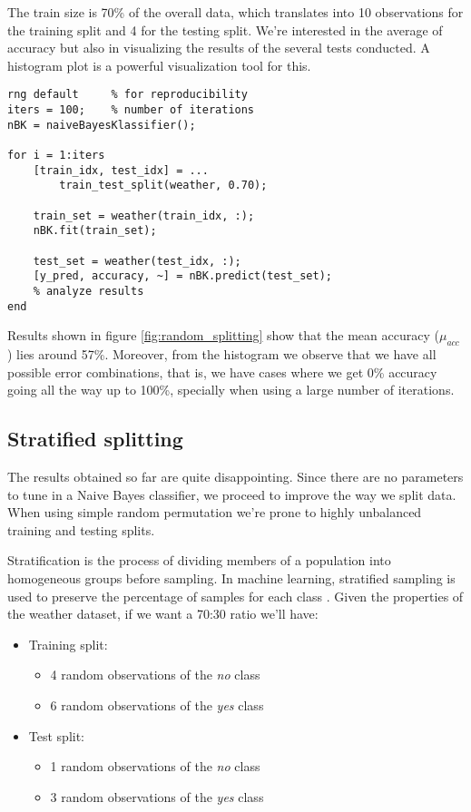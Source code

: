 The train size is 70\% of the overall data, which translates into 10 observations for the training split and 4 for the testing split. We're interested in the average of accuracy but also in visualizing the results of the several tests conducted. A histogram plot is a powerful visualization tool for this.
\begin{lstlisting}[caption=Simple script for testing classifier]
rng default     % for reproducibility
iters = 100;    % number of iterations
nBK = naiveBayesKlassifier();

for i = 1:iters
	[train_idx, test_idx] = ...
		train_test_split(weather, 0.70);
	
	train_set = weather(train_idx, :);
	nBK.fit(train_set);
	
	test_set = weather(test_idx, :);
	[y_pred, accuracy, ~] = nBK.predict(test_set);
	% analyze results
end
\end{lstlisting}

Results shown in figure \ref{fig:random_splitting} show that the mean accuracy ($\mu_{acc}$) lies around 57\%. Moreover, from the histogram we observe that we have all possible error combinations, that is, we have cases where we get 0\% accuracy going all the way up to 100\%, specially when using a large number of iterations.

\subsection{Stratified splitting}

The results obtained so far are quite disappointing. Since there are no parameters to tune in a Naive Bayes classifier, we proceed to improve the way we split data. When using simple random permutation we're prone to highly unbalanced training and testing splits.

Stratification is the process of dividing members of a population into homogeneous groups before sampling. In machine learning, stratified sampling is used to preserve the percentage of samples for each class \cite{scikit-learn}.
Given the properties of the weather dataset, if we want a 70:30 ratio we'll have:
\begin{itemize}
	\item Training split:
	\begin{itemize}
		\item 4 random observations of the \textit{no} class
		\item 6 random observations of the \textit{yes} class
	\end{itemize}
	\item Test split:
	\begin{itemize}
		\item 1 random observations of the \textit{no} class
		\item 3 random observations of the \textit{yes} class
	\end{itemize}
\end{itemize}

